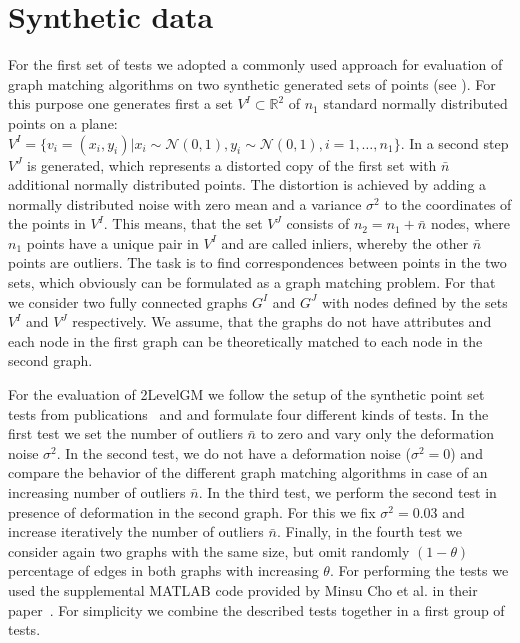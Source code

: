 \section{Synthetic data}
For the first set of tests we adopted a commonly used approach for evaluation of graph matching algorithms on two synthetic generated sets of points (see \cite{Cho2010_RRWM,Cho2014_Haystack,Leordeanu2009_IPFP}). 
For this purpose one generates first a set $V^I\subset\mathbb{R}^2$ of $n_1$ standard normally distributed points on a plane: $V^I=\{v_i=(x_i,y_i)|x_i\sim\mathcal{N}(0,1),y_i\sim\mathcal{N}(0,1),i=1,\dots,n_1\}$. In a second step $V^J$ is generated, which represents a distorted copy of the first set with $\bar{n}$ additional normally distributed points. The distortion is achieved by adding a normally distributed noise with zero mean and a variance $\sigma^2$ to the coordinates of the points in $V^I$. 
This means, that the set $V^J$ consists of $n_2=n_1+\bar{n}$ nodes, where $n_1$ points have a unique pair in $V^I$ and are called inliers, whereby the other $\bar{n}$ points are outliers. The task is to find correspondences between points in the two sets, which obviously can be formulated as a graph matching problem. For that we consider two fully connected graphs $G^I$ and $G^J$ with nodes defined by the sets $V^I$ and $V^J$ respectively. We assume, that the graphs do not have attributes and each node in the first graph can be theoretically matched to each node in the second graph.

For the evaluation of 2LevelGM we follow the setup of the synthetic point set tests from publications~\cite{Cho2014_Haystack} and \cite{FastPFP} and formulate four different kinds of tests. In the first test we set the number of outliers $\bar{n}$ to zero and vary only the deformation noise $\sigma^2$. In the second test, we do not have a deformation noise ($\sigma^2=0$) and compare the behavior of the different graph matching algorithms in case of an increasing number of outliers $\bar{n}$. In the third test, we perform the second test in presence of deformation in the second graph. For this we fix $\sigma^2= 0.03$ and increase iteratively the number of outliers $\bar{n}$. Finally, in the fourth test we consider again two graphs with the same size, but omit randomly $(1-\theta)$ percentage of edges in both graphs with increasing $\theta$. 
For performing the tests we used the supplemental MATLAB code provided by Minsu Cho et al. in their paper~\cite{Cho2014_Haystack}. For simplicity we combine the described tests together in a first group of tests. %

